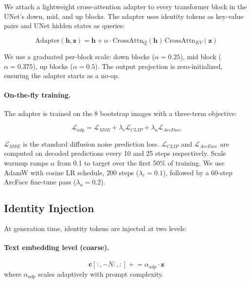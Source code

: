 \documentclass[10pt,twocolumn]{article}
\begin{document}
We attach a lightweight cross-attention adapter to every transformer block in the UNet's down, mid, and up blocks. The adapter uses identity tokens as key-value pairs and UNet hidden states as queries:

\begin{equation}
\text{Adapter}(\mathbf{h}, \mathbf{z}) = \mathbf{h} + \alpha \cdot \text{CrossAttn}_Q(\mathbf{h})\,\text{CrossAttn}_{KV}(\mathbf{z})
\end{equation}

We use a graduated per-block scale: down blocks ($\alpha = 0.25$), mid block ($\alpha = 0.375$), up blocks ($\alpha = 0.5$). The output projection is zero-initialized, ensuring the adapter starts as a no-op.

\paragraph{On-the-fly training.}
The adapter is trained on the 8 bootstrap images with a three-term objective:

\begin{equation}
\mathcal{L}_{adp} = \mathcal{L}_{MSE} + \lambda_{c}\mathcal{L}_{CLIP} + \lambda_{a}\mathcal{L}_{ArcFace}
\end{equation}

$\mathcal{L}_{MSE}$ is the standard diffusion noise prediction loss. $\mathcal{L}_{CLIP}$ and $\mathcal{L}_{ArcFace}$ are computed on decoded predictions every 10 and 25 steps respectively. Scale warmup ramps $\alpha$ from 0.1 to target over the first 50\% of training. We use AdamW with cosine LR schedule, 200 steps ($\lambda_c=0.1$), followed by a 60-step ArcFace fine-tune pass ($\lambda_a=0.2$).

\subsection{Identity Injection}

At generation time, identity tokens are injected at two levels:

\paragraph{Text embedding level (coarse).}
\begin{equation}
\mathbf{c}[:, -N:, :] \mathrel{+}= \alpha_{adp} \cdot \mathbf{z}
\end{equation}
where $\alpha_{adp}$ scales adaptively with prompt complexity.
\end{document}
